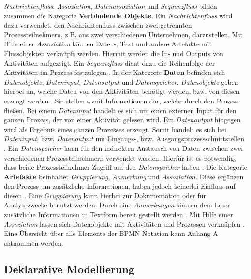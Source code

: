 \textit{Nachrichtenfluss}, \textit{Assoziation}, \textit{Datenassoziation} und \textit{Sequenzfluss} bilden zusammen die Kategorie \textbf{Verbindende Objekte}. Ein \textit{Nachrichtenfluss} wird dazu verwendet, den Nachrichtenfluss zwischen zwei getrennten Prozessteilnehmern, z.B. aus zwei verschiedenen Unternehmen, darzustellen. Mit Hilfe einer \textit{Assoziation} können Daten-, Text und andere Artefakte mit Flussobjekten verknüpft werden. Hiermit werden die In- und Outputs von Aktivitäten aufgezeigt. Ein \textit{Sequenzfluss} dient dazu die Reihenfolge der Aktivitäten im Prozess festzulegen \cite{white2004}. \newline
In der Kategorie \textbf{Daten} befinden sich \textit{Datenobjekte}, \textit{Dateninput}, \textit{Datenoutput} und \textit{Datenspeicher}. \textit{Datenobjekte} geben hierbei an, welche Daten von den Aktivitäten benötigt werden, bzw. von diesen erzeugt werden \cite{white2004}. Sie stellen somit Informationen dar, welche durch den Prozess fließen. Bei einem  \textit{Dateninput} handelt es sich um einen externen Input für den ganzen Prozess, der von einer Aktivität gelesen wird. Ein \textit{Datenoutput} hingegen wird als Ergebnis eines ganzen Prozesses erzeugt. Somit handelt es sich bei \textit{Dateninput}, bzw. \textit{Datenoutput} um Eingangs-, bzw. Ausgangsprozessschnittstellen \cite{bpmnposter}. Ein \textit{Datenspeicher} kann für den indirekten Austausch von Daten zwischen zwei verschiedenen Prozessteilnehmern verwendet werden. Hierfür ist es notwendig, dass beide Prozessteilnehmer Zugriff auf den \textit{Datenspeicher} haben \cite{allweyer2013}.\newline
Die Kategorie \textbf{Artefakte} beinhaltet \textit{Gruppierung}, \textit{Anmerkung} und \textit{Assoziation}.  Diese ergänzen den Prozess um zusätzliche Informationen, haben jedoch keinerlei Einfluss auf diesen \cite{gpfert2012}. Eine \textit{Gruppierung} kann hierbei zur Dokumentation oder für Analysezwecke benutzt werden. Durch eine \textit{Anmerkungen} können dem Leser zusätzliche Informationen in Textform bereit gestellt werden \cite{white2004}. Mit Hilfe einer \textit{Assoziation} lassen sich Datenobjekte mit Aktivitäten und Prozessen verknüpfen \cite{bpmnposter}. \newline
 Eine Übersicht über alle Elemente der BPMN Notation kann Anhang A entnommen werden.\newline





\subsection{Deklarative Modellierung}

